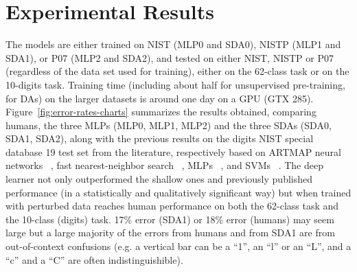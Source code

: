 \documentclass{article} %
\begin{document}
\section{Experimental Results}
\vspace*{-2mm}

The models are either trained on NIST (MLP0 and SDA0), 
NISTP (MLP1 and SDA1), or P07 (MLP2 and SDA2), and tested
on either NIST, NISTP or P07 (regardless of the data set used for training),
either on the 62-class task
or on the 10-digits task. Training time (including about half
for unsupervised pre-training, for DAs) on the larger
datasets is around one day on a GPU (GTX 285).
Figure~\ref{fig:error-rates-charts} summarizes the results obtained,
comparing humans, the three MLPs (MLP0, MLP1, MLP2) and the three SDAs (SDA0, SDA1,
SDA2), along with the previous results on the digits NIST special database
19 test set from the literature, respectively based on ARTMAP neural
networks ~\citep{Granger+al-2007}, fast nearest-neighbor search
~\citep{Cortes+al-2000}, MLPs ~\citep{Oliveira+al-2002-short}, and SVMs
~\citep{Milgram+al-2005}.%
The deep learner not only outperformed the shallow ones and
previously published performance (in a statistically and qualitatively
significant way) but when trained with perturbed data
reaches human performance on both the 62-class task
and the 10-class (digits) task. 
17\% error (SDA1) or 18\% error (humans) may seem large but a large
majority of the errors from humans and from SDA1 are from out-of-context
confusions (e.g. a vertical bar can be a ``1'', an ``l'' or an ``L'', and a
``c'' and a ``C'' are often indistinguishible).
\end{document}
